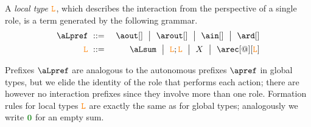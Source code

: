 %

A {\em local type} $\texttt{\textcolor{orange}L}$, which describes the interaction from the perspective of a single 
role,  is a term generated by the following grammar.
\begin{eqnarray*}
  \aLpref & \bnfdef &
                  \aout[] \bnfmid
                  \arout[]\bnfmid
                  \ain[] \bnfmid
                  \ard[] 
\\
  \aL & \bnfdef &
                  \aLsum \bnfmid
                  \aL; \aL \bnfmid
                  X \bnfmid
                  \arec[@][\aL]
\end{eqnarray*}


Prefixes $\aLpref$  are analogous to the autonomous prefixes $\apref$ in global types, but 
we elide the identity of the role that performs each action; there are however
 no interaction prefixes since they 
involve more than one role. Formation rules for local types $\texttt{\textcolor{orange}L}$ are exactly the same as for 
global types; analogously we write $\nil$ for an empty sum. 

